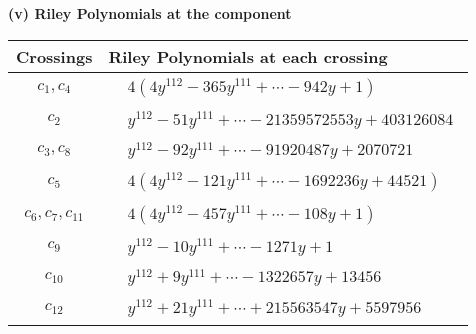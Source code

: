 \documentclass[1p]{elsarticle_modified}
\theoremstyle{definition}
\begin{document}
\newpage\renewcommand{\arraystretch}{1}
\flushleft \textbf{(v) Riley Polynomials at the component}\newline \\
\begin{tabular}{m{50pt}|m{274pt}}
Crossings & \hspace{64pt}Riley Polynomials at each crossing \\
\hline $$\begin{aligned}c_{1},c_{4}\end{aligned}$$&$\begin{aligned}
&4(4 y^{112}-365 y^{111}+\cdots-942 y+1)
\end{aligned}$\\
\hline $$\begin{aligned}c_{2}\end{aligned}$$&$\begin{aligned}
&y^{112}-51 y^{111}+\cdots-21359572553 y+403126084
\end{aligned}$\\
\hline $$\begin{aligned}c_{3},c_{8}\end{aligned}$$&$\begin{aligned}
&y^{112}-92 y^{111}+\cdots-91920487 y+2070721
\end{aligned}$\\
\hline $$\begin{aligned}c_{5}\end{aligned}$$&$\begin{aligned}
&4(4 y^{112}-121 y^{111}+\cdots-1692236 y+44521)
\end{aligned}$\\
\hline $$\begin{aligned}c_{6},c_{7},c_{11}\end{aligned}$$&$\begin{aligned}
&4(4 y^{112}-457 y^{111}+\cdots-108 y+1)
\end{aligned}$\\
\hline $$\begin{aligned}c_{9}\end{aligned}$$&$\begin{aligned}
&y^{112}-10 y^{111}+\cdots-1271 y+1
\end{aligned}$\\
\hline $$\begin{aligned}c_{10}\end{aligned}$$&$\begin{aligned}
&y^{112}+9 y^{111}+\cdots-1322657 y+13456
\end{aligned}$\\
\hline $$\begin{aligned}c_{12}\end{aligned}$$&$\begin{aligned}
&y^{112}+21 y^{111}+\cdots+215563547 y+5597956
\end{aligned}$\\
\hline
\end{tabular}\\~\\
\end{document}
